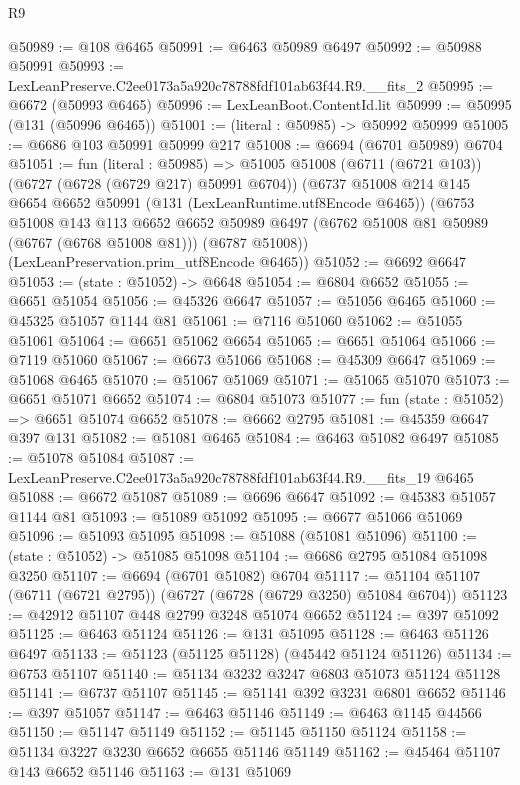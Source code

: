 \begin{lexlean}{R9}
\begin{coremodule}
@50989 := @108 @6465
@50991 := @6463 @50989 @6497
@50992 := @50988 @50991
@50993 := LexLeanPreserve.C2ee0173a5a920c78788fdf101ab63f44.R9.__fits_2
@50995 := @6672 (@50993 @6465)
@50996 := LexLeanBoot.ContentId.lit
@50999 := @50995 (@131 (@50996 @6465))
@51001 := (literal : @50985) -> @50992 @50999
@51005 := @6686 @103 @50991 @50999 @217
@51008 := @6694 (@6701 @50989) @6704
@51051 := fun (literal : @50985) =>
  @51005
    @51008
    (@6711 (@6721 @103))
    (@6727 (@6728 (@6729 @217) @50991 @6704))
    (@6737
      @51008
      @214
      @145
      @6654
      @6652
      @50991
      (@131 (LexLeanRuntime.utf8Encode @6465))
      (@6753
        @51008
        @143
        @113
        @6652
        @6652
        @50989
        @6497
        (@6762 @51008 @81 @50989 (@6767 (@6768 @51008 @81)))
        (@6787 @51008))
      (LexLeanPreservation.prim_utf8Encode @6465))
@51052 := @6692 @6647
@51053 := (state : @51052) -> @6648
@51054 := @6804 @6652
@51055 := @6651 @51054
@51056 := @45326 @6647
@51057 := @51056 @6465
@51060 := @45325 @51057 @1144 @81
@51061 := @7116 @51060
@51062 := @51055 @51061
@51064 := @6651 @51062 @6654
@51065 := @6651 @51064
@51066 := @7119 @51060
@51067 := @6673 @51066
@51068 := @45309 @6647
@51069 := @51068 @6465
@51070 := @51067 @51069
@51071 := @51065 @51070
@51073 := @6651 @51071 @6652
@51074 := @6804 @51073
@51077 := fun (state : @51052) => @6651 @51074 @6652
@51078 := @6662 @2795
@51081 := @45359 @6647 @397 @131
@51082 := @51081 @6465
@51084 := @6463 @51082 @6497
@51085 := @51078 @51084
@51087 := LexLeanPreserve.C2ee0173a5a920c78788fdf101ab63f44.R9.__fits_19 @6465
@51088 := @6672 @51087
@51089 := @6696 @6647
@51092 := @45383 @51057 @1144 @81
@51093 := @51089 @51092
@51095 := @6677 @51066 @51069
@51096 := @51093 @51095
@51098 := @51088 (@51081 @51096)
@51100 := (state : @51052) -> @51085 @51098
@51104 := @6686 @2795 @51084 @51098 @3250
@51107 := @6694 (@6701 @51082) @6704
@51117 := @51104 @51107 (@6711 (@6721 @2795)) (@6727 (@6728 (@6729 @3250) @51084 @6704))
@51123 := @42912 @51107 @448 @2799 @3248 @51074 @6652
@51124 := @397 @51092
@51125 := @6463 @51124
@51126 := @131 @51095
@51128 := @6463 @51126 @6497
@51133 := @51123 (@51125 @51128) (@45442 @51124 @51126)
@51134 := @6753 @51107
@51140 := @51134 @3232 @3247 @6803 @51073 @51124 @51128
@51141 := @6737 @51107
@51145 := @51141 @392 @3231 @6801 @6652
@51146 := @397 @51057
@51147 := @6463 @51146
@51149 := @6463 @1145 @44566
@51150 := @51147 @51149
@51152 := @51145 @51150 @51124
@51158 := @51134 @3227 @3230 @6652 @6655 @51146 @51149
@51162 := @45464 @51107 @143 @6652 @51146
@51163 := @131 @51069

\end{coremodule}
\end{lexlean}
